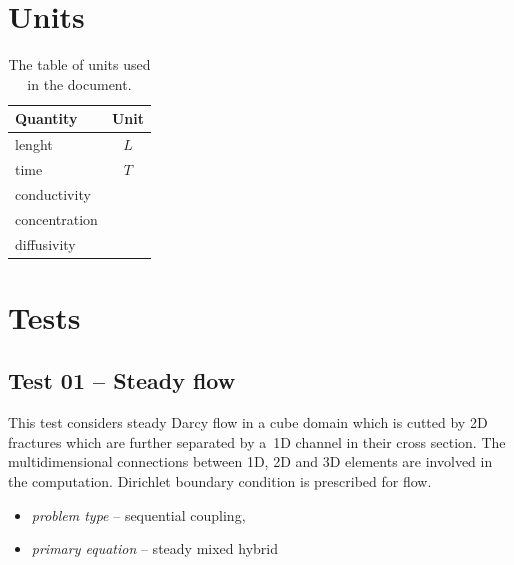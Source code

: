 %
%
%
%

\chapter{Units}
\begin{table}
  \label{tab:units}
  \begin{center}
    \begin{tabular}{|l|c|}
      \hline
      \textbf{Quantity} & \textbf{Unit} \\
      \hline 
      lenght & $L$ \\
      time & $T$ \\
      conductivity & $ $ \\
      concentration & $ $ \\
      diffusivity & $ $ \\
      \hline
    \end{tabular}
  \caption{The table of units used in the document.}
  \end{center}
\end{table}

\chapter{Tests}
\label{sec:tests}



\section{Test 01 -- Steady flow}
\label{sec:test01}
This test considers steady Darcy flow in a cube domain which is cutted by 2D fractures which are further separated by a~1D channel in their cross section. The multidimensional connections between 1D, 2D and 3D elements are involved in the computation. Dirichlet boundary condition is prescribed for flow.
  \begin{itemize} 
    \item \emph{problem type} -- sequential coupling, 
    \item \emph{primary equation} -- steady mixed hybrid
  \end{itemize}

